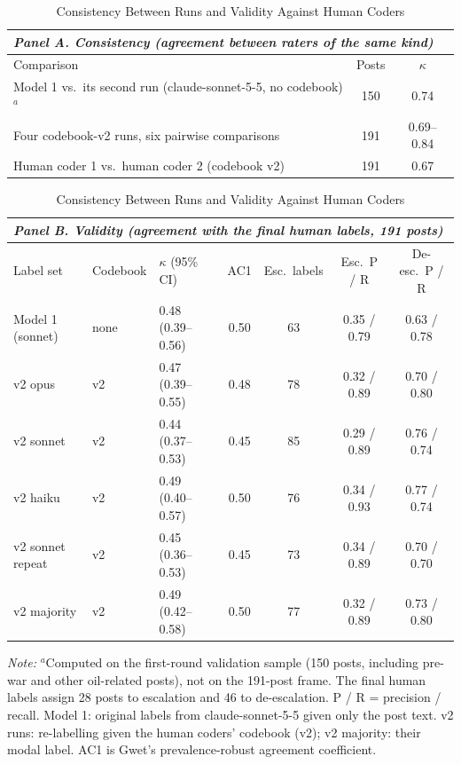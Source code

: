 \documentclass[12pt]{article}
\begin{document}
\begin{table}[p]
\centering
\small
\caption{Consistency Between Runs and Validity Against Human Coders}
\label{tab:agreement}
\begin{tabular}{lcc}
\multicolumn{3}{l}{\textit{Panel A. Consistency (agreement between raters of the same kind)}}\\
\toprule
Comparison & Posts & $\kappa$ \\
\midrule
Model 1 vs.\ its second run (claude-sonnet-5-5, no codebook)$^{a}$ & 150 & 0.74 \\
Four codebook-v2 runs, six pairwise comparisons & 191 & 0.69--0.84 \\
Human coder 1 vs.\ human coder 2 (codebook v2) & 191 & 0.67 \\
\bottomrule
\end{tabular}

\vspace{1em}
\begin{tabular}{lllcccc}
\multicolumn{7}{l}{\textit{Panel B. Validity (agreement with the final human labels, 191 posts)}}\\
\toprule
Label set & Codebook & $\kappa$ (95\% CI) & AC1 & Esc.\ labels & Esc.\ P / R & De-esc.\ P / R \\
\midrule
Model 1 (sonnet) & none & 0.48 (0.39--0.56) & 0.50 & 63 & 0.35 / 0.79 & 0.63 / 0.78 \\
v2 opus & v2 & 0.47 (0.39--0.55) & 0.48 & 78 & 0.32 / 0.89 & 0.70 / 0.80 \\
v2 sonnet & v2 & 0.44 (0.37--0.53) & 0.45 & 85 & 0.29 / 0.89 & 0.76 / 0.74 \\
v2 haiku & v2 & 0.49 (0.40--0.57) & 0.50 & 76 & 0.34 / 0.93 & 0.77 / 0.74 \\
v2 sonnet repeat & v2 & 0.45 (0.36--0.53) & 0.45 & 73 & 0.34 / 0.89 & 0.70 / 0.70 \\
v2 majority & v2 & 0.49 (0.42--0.58) & 0.50 & 77 & 0.32 / 0.89 & 0.73 / 0.80 \\
\bottomrule
\end{tabular}

\vspace{0.5em}
\begin{minipage}{0.95\textwidth}
\footnotesize\textit{Note:} $^{a}$Computed on the first-round validation sample (150 posts, including pre-war and other oil-related posts), not on the 191-post frame. The final human labels assign 28 posts to escalation and 46 to de-escalation. P / R = precision / recall. Model 1: original labels from claude-sonnet-5-5 given only the post text. v2 runs: re-labelling given the human coders' codebook (v2); v2 majority: their modal label. AC1 is Gwet's prevalence-robust agreement coefficient.
\end{minipage}
\end{table}
\end{document}
